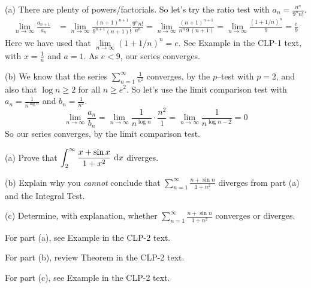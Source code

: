 \begin{solution}
(a)  There are plenty of powers/factorials. So let's try the ratio test
with $a_n= \frac{n^n}{9^n n!}$.
\begin{align*}
\lim_{n\rightarrow\infty}\frac{a_{n+1}}{a_n}
&=\lim_{n\rightarrow\infty}\frac{(n+1)^{n+1}}{9^{n+1}(n+1)!}\frac{9^nn!}{n^n}
=\lim_{n\rightarrow\infty}\frac{(n+1)^{n+1}}{n^n\,9\,(n+1)}
=\lim_{n\rightarrow\infty}\frac{(1+1/n)^n}{9}
=\frac{e}{9}
\end{align*}
Here we have used that $\lim\limits_{n\rightarrow\infty}(1+1/n)^n=e$.
See Example  in the CLP-1 text,
with $x=\frac{1}{n}$ and $a=1$. As $e<9$, our series converges.

\noindent (b)  We know that the series $\sum_{n=1}^\infty \frac{1}{n^2}$ converges,
by the $p$--test with $p=2$, and also that $\log n \ge 2$ for all $n\ge e^2$.
So let's use the limit comparison test with $a_n=\frac{1}{n^{\log n}}$ and
$b_n=\frac{1}{n^2}$.
\begin{equation*}
\lim_{n\rightarrow\infty}\frac{a_n}{b_n}
=\lim_{n\rightarrow\infty}\frac{1}{n^{\log n}}\cdot\frac{n^2}{1}
=\lim_{n\rightarrow\infty}\frac{1}{n^{\log n-2}}
=0
\end{equation*}
So our series converges, by the limit comparison test.

\end{solution}


\begin{Mquestion}[2013A]
(a)
Prove that $\displaystyle \int_2^\infty\frac{x+\sin x}{1+x^2}\ \mathrm{d}x$ diverges.

\noindent (b)
Explain why you \emph{cannot} conclude that
 $\displaystyle\sum\limits_{n=1}^\infty \frac{n+\sin n}{1+n^2}$
diverges from part (a) and the Integral Test.

\noindent (c)
Determine, with explanation, whether
$\displaystyle\sum\limits_{n=1}^\infty \frac{n+\sin n}{1+n^2}$
converges or diverges.
\end{Mquestion}

\begin{hint}
For part (a),  see Example  in the
CLP-2 text.

\noindent
For part (b), review  Theorem   in the
CLP-2 text.

\noindent
For part (c),  see Example  in the
CLP-2 text.
\end{hint}

